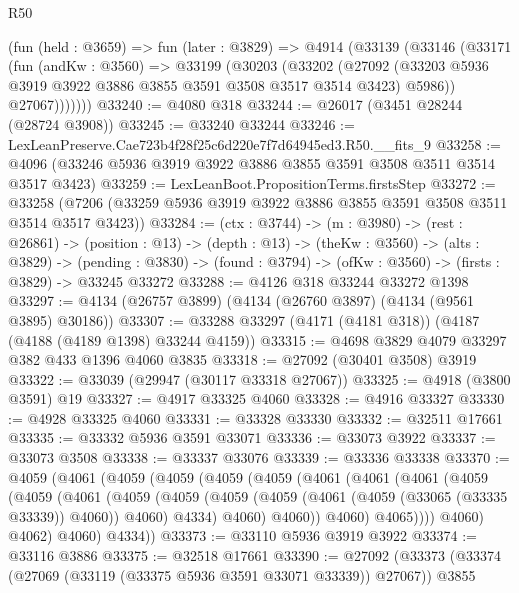 \begin{lexlean}{R50}
\begin{coremodule}
      (fun (held : @3659) =>
      fun (later : @3829) =>
      @4914
        (@33139
          (@33146
            (@33171
              (fun (andKw : @3560) =>
              @33199
                (@30203
                  (@33202
                    (@27092
                      (@33203 @5936 @3919 @3922 @3886 @3855 @3591 @3508 @3517 @3514 @3423)
                      @5986))
                  @27067)))))))
@33240 := @4080 @318
@33244 := @26017 (@3451 @28244 (@28724 @3908))
@33245 := @33240 @33244
@33246 := LexLeanPreserve.Cae723b4f28f25c6d220e7f7d64945ed3.R50.__fits_9
@33258 := @4096 (@33246 @5936 @3919 @3922 @3886 @3855 @3591 @3508 @3511 @3514 @3517 @3423)
@33259 := LexLeanBoot.PropositionTerms.firstsStep
@33272 := @33258 (@7206 (@33259 @5936 @3919 @3922 @3886 @3855 @3591 @3508 @3511 @3514 @3517 @3423))
@33284 := (ctx : @3744) ->
  (m : @3980) ->
  (rest : @26861) ->
  (position : @13) ->
  (depth : @13) ->
  (theKw : @3560) ->
  (alts : @3829) ->
  (pending : @3830) -> (found : @3794) -> (ofKw : @3560) -> (firsts : @3829) -> @33245 @33272
@33288 := @4126 @318 @33244 @33272 @1398
@33297 := @4134 (@26757 @3899) (@4134 (@26760 @3897) (@4134 (@9561 @3895) @30186))
@33307 := @33288 @33297 (@4171 (@4181 @318)) (@4187 (@4188 (@4189 @1398) @33244 @4159))
@33315 := @4698 @3829 @4079 @33297 @382 @433 @1396 @4060 @3835
@33318 := @27092 (@30401 @3508) @3919
@33322 := @33039 (@29947 (@30117 @33318 @27067))
@33325 := @4918 (@3800 @3591) @19
@33327 := @4917 @33325 @4060
@33328 := @4916 @33327
@33330 := @4928 @33325 @4060
@33331 := @33328 @33330
@33332 := @32511 @17661
@33335 := @33332 @5936 @3591 @33071
@33336 := @33073 @3922
@33337 := @33073 @3508
@33338 := @33337 @33076
@33339 := @33336 @33338
@33370 := @4059
    (@4061
      (@4059
        (@4059
          (@4059
            (@4059
              (@4061
                (@4061
                  (@4061
                    (@4059
                      (@4059
                        (@4061
                          (@4059
                            (@4059
                              (@4059
                                (@4059 (@4061 (@4059 (@33065 (@33335 @33339)) @4060)) @4060)
                                @4334)
                              @4060)
                            @4060))
                        @4060)
                      @4065))))
              @4060)
            @4062)
          @4060)
        @4334))
@33373 := @33110 @5936 @3919 @3922
@33374 := @33116 @3886
@33375 := @32518 @17661
@33390 := @27092
    (@33373
      (@33374 (@27069 (@33119 (@33375 @5936 @3591 @33071 @33339)) @27067))
      @3855

\end{coremodule}
\end{lexlean}
